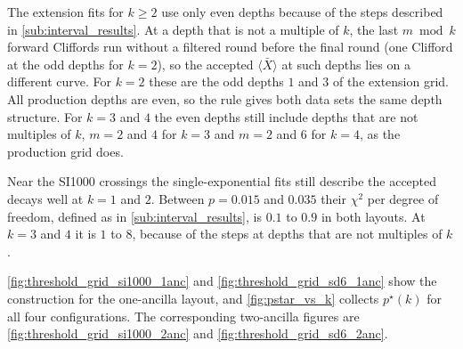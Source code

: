 The extension fits for $k \ge 2$ use only even depths because of the steps described in \autoref{sub:interval_results}. At a depth that is not a multiple of $k$, the last $m \bmod k$ forward Cliffords run without a filtered round before the final round (one Clifford at the odd depths for $k = 2$), so the accepted $\langle \bar{X} \rangle$ at such depths lies on a different curve. For $k = 2$ these are the odd depths $1$ and $3$ of the extension grid. All production depths are even, so the rule gives both data sets the same depth structure. For $k = 3$ and $4$ the even depths still include depths that are not multiples of $k$, $m = 2$ and $4$ for $k = 3$ and $m = 2$ and $6$ for $k = 4$, as the production grid does.

Near the SI1000 crossings the single-exponential fits still describe the accepted decays well at $k = 1$ and $2$. Between $p = 0.015$ and $0.035$ their $\chi^2$ per degree of freedom, defined as in \autoref{sub:interval_results}, is $0.1$ to $0.9$ in both layouts. At $k = 3$ and $4$ it is $1$ to $8$, because of the steps at depths that are not multiples of $k$.

\autoref{fig:threshold_grid_si1000_1anc} and \autoref{fig:threshold_grid_sd6_1anc} show the construction for the one-ancilla layout, and \autoref{fig:pstar_vs_k} collects $p^\star(k)$ for all four configurations. The corresponding two-ancilla figures are \autoref{fig:threshold_grid_si1000_2anc} and \autoref{fig:threshold_grid_sd6_2anc}.

